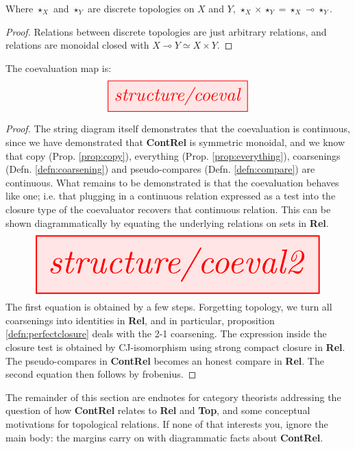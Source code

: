 {\begin{proposition}\label{defn:perfectclosure}
Where $\star_X$ and $\star_Y$ are discrete topologies on $X$ and $Y$, $\star_X \times \star_Y = \star_X \multimap \star_Y$.
\begin{proof}
Relations between discrete topologies are just arbitrary relations, and relations are monoidal closed with $X \multimap Y \simeq X \times Y$.
\end{proof}
\end{proposition}

\begin{proposition}\label{prop:coclosure}
The coevaluation map is:
\[\resizebox{0.5\textwidth}{!}{\tikzfig{structure/coeval}}\]
\begin{proof}
The string diagram itself demonstrates that the coevaluation is continuous, since we have demonstrated that \textbf{ContRel} is symmetric monoidal, and we know that copy (Prop. \ref{prop:copy}), everything (Prop. \ref{prop:everything}), coarsenings (Defn. \ref{defn:coarsening}) and pseudo-compares (Defn. \ref{defn:compare}) are continuous. What remains to be demonstrated is that the coevaluation behaves like one; i.e. that plugging in a continuous relation expressed as a test into the closure type of the coevaluator recovers that continuous relation. This can be shown diagrammatically by equating the underlying relations on sets in \textbf{Rel}.
\[\resizebox{\textwidth}{!}{\tikzfig{structure/coeval2}}\]
The first equation is obtained by a few steps. Forgetting topology, we turn all coarsenings into identities in \textbf{Rel}, and in particular, proposition \ref{defn:perfectclosure} deals with the 2-1 coarsening. The expression inside the closure test is obtained by CJ-isomorphism using strong compact closure in \textbf{Rel}. The pseudo-compares in \textbf{ContRel} becomes an honest compare in \textbf{Rel}. The second equation then follows by frobenius.
\end{proof}
\end{proposition}

 The remainder of this section are endnotes for category theorists addressing the question of how \textbf{ContRel} relates to \textbf{Rel} and \textbf{Top}, and some conceptual motivations for topological relations. If none of that interests you, ignore the main body: the margins carry on with diagrammatic facts about \textbf{ContRel}.

\newpage

}
